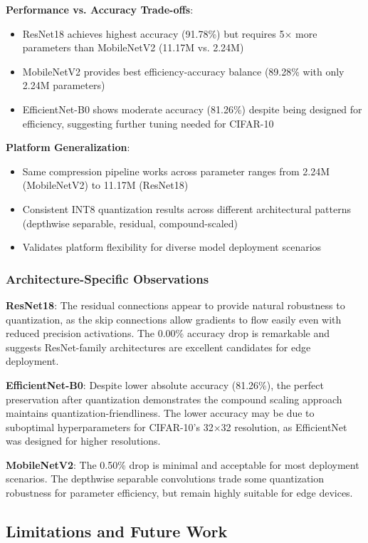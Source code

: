 \textbf{Performance vs. Accuracy Trade-offs}:
\begin{itemize}
\item ResNet18 achieves highest accuracy (91.78\%) but requires 5$\times$ more parameters than MobileNetV2 (11.17M vs. 2.24M)
\item MobileNetV2 provides best efficiency-accuracy balance (89.28\% with only 2.24M parameters)
\item EfficientNet-B0 shows moderate accuracy (81.26\%) despite being designed for efficiency, suggesting further tuning needed for CIFAR-10
\end{itemize}

\textbf{Platform Generalization}:
\begin{itemize}
\item Same compression pipeline works across parameter ranges from 2.24M (MobileNetV2) to 11.17M (ResNet18)
\item Consistent INT8 quantization results across different architectural patterns (depthwise separable, residual, compound-scaled)
\item Validates platform flexibility for diverse model deployment scenarios
\end{itemize}

\subsubsection{Architecture-Specific Observations}

\textbf{ResNet18}: The residual connections appear to provide natural robustness to quantization, as the skip connections allow gradients to flow easily even with reduced precision activations. The 0.00\% accuracy drop is remarkable and suggests ResNet-family architectures are excellent candidates for edge deployment.

\textbf{EfficientNet-B0}: Despite lower absolute accuracy (81.26\%), the perfect preservation after quantization demonstrates the compound scaling approach maintains quantization-friendliness. The lower accuracy may be due to suboptimal hyperparameters for CIFAR-10's 32$\times$32 resolution, as EfficientNet was designed for higher resolutions.

\textbf{MobileNetV2}: The 0.50\% drop is minimal and acceptable for most deployment scenarios. The depthwise separable convolutions trade some quantization robustness for parameter efficiency, but remain highly suitable for edge devices.

\subsection{Limitations and Future Work}


